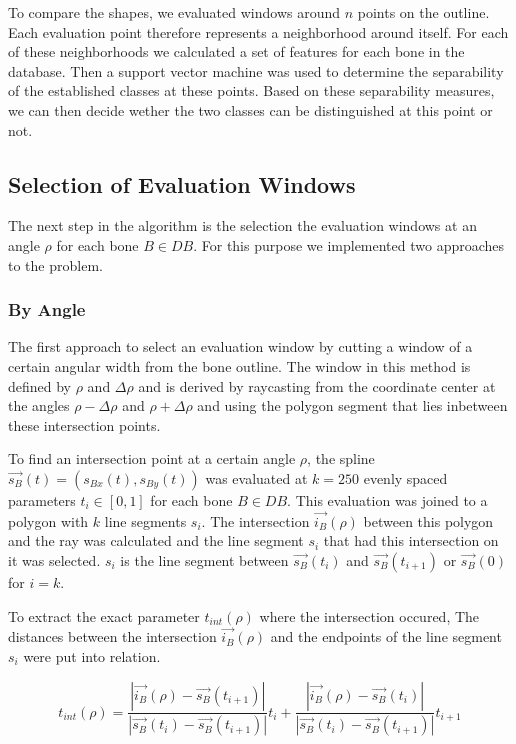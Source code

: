 \documentclass[pdftex,12pt,a4paper]{report}
\begin{document}
To compare the shapes, we evaluated windows around $n$ points on the outline. Each evaluation
point therefore represents a neighborhood around itself. For each of these neighborhoods
we calculated a set of features for each bone in the database. Then a support vector machine
was used to determine the separability of the established classes at these points. Based on 
these separability measures, we can then decide wether the two classes can be distinguished
at this point or not. 

\subsection{Selection of Evaluation Windows}

The next step in the algorithm is the selection the evaluation windows at an angle $\rho$ for
each bone $B \in DB$. For this purpose we implemented two approaches to the problem.

\subsubsection{By Angle}
\label{subsub:windowbyangle}

The first approach to select an evaluation window by cutting a window of a certain angular
width from the bone outline. The window in this method is defined by $\rho$ and $\Delta\rho$
and is derived by raycasting from the coordinate center at the angles $\rho - \Delta\rho$ and 
$\rho + \Delta\rho$ and using the polygon segment that lies inbetween these intersection points. 

To find an intersection point at a certain angle $\rho$, the spline $\vec{s_B}(t) = (s_{Bx}(t), s_{By}(t))$ was evaluated at $k=250$ evenly spaced
parameters $t_i \in [0,1]$ for each bone $B \in DB$. This evaluation was joined to a polygon
with $k$ line segments $s_i$. The intersection $\vec{i_B}(\rho)$ between this polygon and the ray was calculated and
the line segment $s_i$ that had this intersection on it was selected. $s_i$ is the line
segment between $\vec{s_B}(t_i)$ and $\vec{s_B}(t_{i+1})$ or $\vec{s_B}(0)$ for $i=k$.

To extract the exact parameter $t_{int}(\rho)$ where the intersection occured, The distances
between the intersection $\vec{i_B}(\rho)$ and the endpoints of the line segment $s_i$ were put into relation.

\begin{equation}
t_{int}(\rho) =
\frac{|\vec{i_B}(\rho) - \vec{s_B}(t_{i+1})|}{|\vec{s_B}(t_i) - \vec{s_B}(t_{i+1})|} t_i +
\frac{|\vec{i_B}(\rho) - \vec{s_B}(t_i)|}{|\vec{s_B}(t_i) - \vec{s_B}(t_{i+1})|} t_{i+1}
\end{equation}
\end{document}
